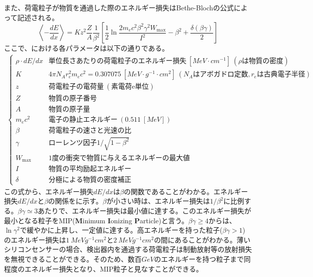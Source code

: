 また、荷電粒子が物質を通過した際のエネルギー損失はBethe-Blochの公式によって記述される。
\begin{equation}
  \label{eq:bethe}
  \left\langle -\frac{dE}{dx} \right\rangle = Kz^2\frac{Z}{A}\frac{1}{\beta^2}\left[ \frac{1}{2}\ln\frac{2m_e c^2 \beta^2 \gamma^2 W_\mathrm{max}}{I^2} -\beta^2 + \frac{\delta (\beta\gamma)}{2} \right]
\end{equation}
ここで、における各パラメータは以下の通りである。
\begin{align*}
  \begin{cases}
    \rho\cdot dE/dx & \mathrm{単位長さあたりの荷電粒子のエネルギー損失}\ [\si{MeV\cdot cm^{-1}}]\ (\rho\mathrm{は物質の密度}) \\
    K & 4\pi N_A r^2_e m_e c^2 = 0.307075\ [\si{MeV\cdot g^{-1}\cdot cm^2}]\ (N_A\mathrm{はアボガドロ定数}, r_e\mathrm{は古典電子半径})\\
    z & \mathrm{荷電粒子の電荷量\ (素電荷e単位)}\\
    Z & \mathrm{物質の原子番号}\\
    A & \mathrm{物質の原子量}\\
    m_e c^2 & \mathrm{電子の静止エネルギー}\ (0.511\ [\si{MeV}]) \\
    \beta & \mathrm{荷電粒子の速さと光速の比}\\
    \gamma & \mathrm{ローレンツ因子} 1/\sqrt{1-\beta^2} \\
    W_\mathrm{max} & \mathrm{1度の衝突で物質に与えるエネルギーの最大値} \\
    I & \mathrm{物質の平均励起エネルギー}\\
    \delta & \mathrm{分極による物質の密度補正}
  \end{cases}
\end{align*}
この式から、エネルギー損失$dE/dx$は$\beta$の関数であることがわかる。エネルギー損失$dE/dx$と$\beta$の関係をに示す。$\beta$が小さい時は、エネルギー損失は$1/\beta^2$に比例する。$\beta\gamma \simeq 3$あたりで、エネルギー損失は最小値に達する。このエネルギー損失が最小となる粒子をMIP(\textbf{M}inimum \textbf{I}onizing \textbf{P}article)と言う。$\beta\gamma\geq4$からは、$\ln\gamma^2$で緩やかに上昇し、一定値に達する。高エネルギーを持った粒子($\beta\gamma>1$)のエネルギー損失は$1\ \si{MeVg^{-1}cm^2}$と$2\ \si{MeVg^{-1}cm^2}$の間にあることがわかる。薄いシリコンセンサーの場合、検出器内を通過する荷電粒子は制動放射等の放射損失を無視できることができる。そのため、数百$\si{GeV}$のエネルギーを持つ粒子まで同程度のエネルギー損失となり、MIP粒子と見なすことができる。

